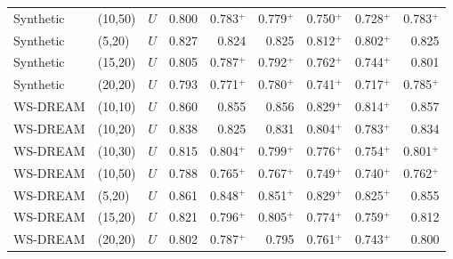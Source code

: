 \begin{tabular}{llrrrrrrr}
Synthetic & (10,50) & $U$ & 0.800 & 0.783$^{+}$ & 0.779$^{+}$ & 0.750$^{+}$ & 0.728$^{+}$ & 0.783$^{+}$\\
Synthetic & (5,20) & $U$ & 0.827 & 0.824 & 0.825 & 0.812$^{+}$ & 0.802$^{+}$ & 0.825\\
Synthetic & (15,20) & $U$ & 0.805 & 0.787$^{+}$ & 0.792$^{+}$ & 0.762$^{+}$ & 0.744$^{+}$ & 0.801\\
Synthetic & (20,20) & $U$ & 0.793 & 0.771$^{+}$ & 0.780$^{+}$ & 0.741$^{+}$ & 0.717$^{+}$ & 0.785$^{+}$\\
WS-DREAM & (10,10) & $U$ & 0.860 & 0.855 & 0.856 & 0.829$^{+}$ & 0.814$^{+}$ & 0.857\\
WS-DREAM & (10,20) & $U$ & 0.838 & 0.825 & 0.831 & 0.804$^{+}$ & 0.783$^{+}$ & 0.834\\
WS-DREAM & (10,30) & $U$ & 0.815 & 0.804$^{+}$ & 0.799$^{+}$ & 0.776$^{+}$ & 0.754$^{+}$ & 0.801$^{+}$\\
WS-DREAM & (10,50) & $U$ & 0.788 & 0.765$^{+}$ & 0.767$^{+}$ & 0.749$^{+}$ & 0.740$^{+}$ & 0.762$^{+}$\\
WS-DREAM & (5,20) & $U$ & 0.861 & 0.848$^{+}$ & 0.851$^{+}$ & 0.829$^{+}$ & 0.825$^{+}$ & 0.855\\
WS-DREAM & (15,20) & $U$ & 0.821 & 0.796$^{+}$ & 0.805$^{+}$ & 0.774$^{+}$ & 0.759$^{+}$ & 0.812\\
WS-DREAM & (20,20) & $U$ & 0.802 & 0.787$^{+}$ & 0.795 & 0.761$^{+}$ & 0.743$^{+}$ & 0.800\\
\bottomrule
\end{tabular}